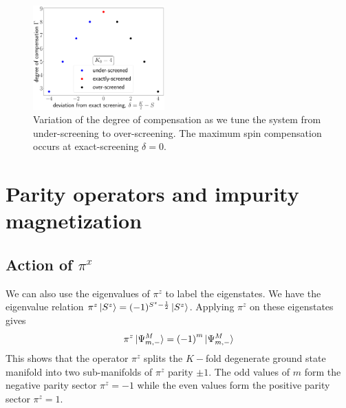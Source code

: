 \documentclass[12pt]{revtex4-2}
\begin{document}
\begin{figure}[htpb]
	\centering
	\includegraphics[width=0.45\textwidth]{../numerics/deg_of_comp.pdf}
	\caption{Variation of the degree of compensation as we tune the system from under-screening to over-screening. The maximum spin compensation occurs at exact-screening \(\delta=0\).}
\end{figure}

\section{Parity operators and impurity magnetization}

\subsection{Action of \(\pi^x\)}
We can also use the eigenvalues of \(\pi^z\) to label the eigenstates. We have the eigenvalue relation \(\pi^z \ket{S^z} = (-1)^{S^z - \frac{1}{2}}\ket{S^z}\). Applying \(\pi^z\) on these eigenstates gives
\begin{align}
	\pi^z\ket{\Psi^M_{m,-}} = \left( -1 \right) ^{m}\ket{\Psi^M_{m,-}}
\end{align}
This shows that the operator \(\pi^z\) splits the \(K-\)fold degenerate ground state manifold into two sub-manifolds of \(\pi^z\) parity \(\pm 1\). The odd values of \(m\) form the negative parity sector \(\pi^z = -1\) while the even values form the positive parity sector \(\pi^z = 1\).
\end{document}
